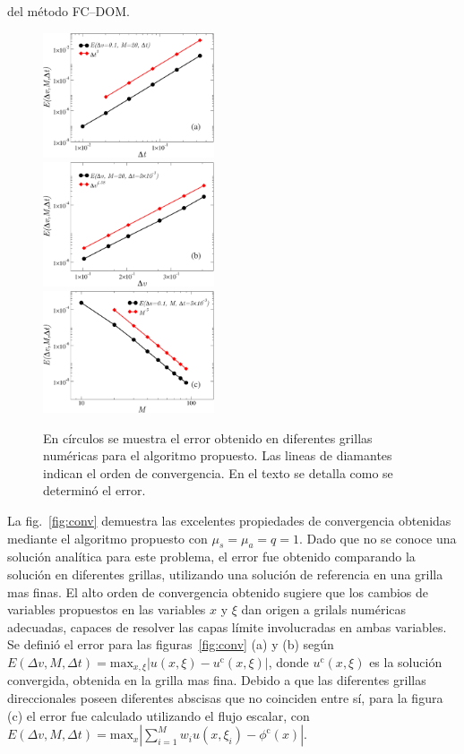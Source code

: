 del método FC--DOM. 
\pagebreak
\begin{figure}
  \includegraphics[width=0.45\textwidth]{figuras/errdt.pdf}\\
  \vspace{2mm}
  \includegraphics[width=0.45\textwidth]{figuras/errdx.pdf}\\
  \vspace{2mm}
  \includegraphics[width=0.45\textwidth]{figuras/xiconv.pdf}
  \caption{En círculos 
  se muestra el error obtenido en diferentes grillas numéricas para el algoritmo 
  propuesto. Las lineas 
  de diamantes indican el orden de convergencia. En el texto se detalla 
  como se determinó el error.}
 \label{fig:conv}
\end{figure}

La fig.~\eqref{fig:conv} demuestra las excelentes propiedades de convergencia 
obtenidas mediante el algoritmo propuesto con $\mu_s=\mu_a=q=1$. Dado 
que no se conoce una solución analítica para este problema, 
el error fue obtenido comparando la solución en diferentes grillas, utilizando 
una solución de referencia en una grilla mas finas. El alto orden 
de convergencia obtenido sugiere que los cambios de variables 
propuestos en las variables $x$ y $\xi$ dan origen a grilals numéricas 
adecuadas, capaces de resolver las capas límite involucradas en ambas variables. 
Se definió el error para las figuras~\eqref{fig:conv} (a) y (b) según
  $E(\Delta v, M,\Delta t)=\text{max}_{x,\xi}
    |u(x,\xi)-u^{\text{c}}(x,\xi)|$, donde $u^{\text{c}}(x,\xi)$ 
    es la solución convergida, obtenida en la grilla mas fina. 
Debido a que las diferentes 
    grillas direccionales poseen diferentes abscisas que no coinciden 
    entre sí, para la figura (c) 
    el error fue calculado utilizando el flujo escalar, con  
$E(\Delta v, M,\Delta t)=\text{max}_x |\sum_{i=1}^M w_i u(x,\xi_i)-\phi^{\text{c}}(x)|$.

